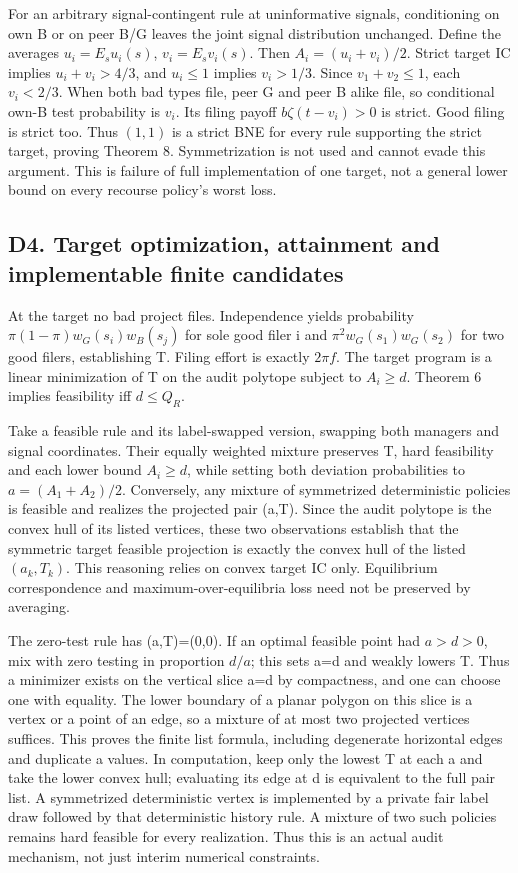 \documentclass[
  11pt,
]{article}
\begin{document}
For an arbitrary signal-contingent rule at uninformative signals,
conditioning on own B or on peer B/G leaves the joint signal
distribution unchanged. Define the averages \(u_i=E_s u_i(s)\),
\(v_i=E_s v_i(s)\). Then \(A_i=(u_i+v_i)/2\). Strict target IC implies
\(u_i+v_i>4/3\), and \(u_i\leq1\) implies \(v_i>1/3\). Since
\(v_1+v_2\leq1\), each \(v_i<2/3\). When both bad types file, peer G and
peer B alike file, so conditional own-B test probability is \(v_i\). Its
filing payoff \(b\zeta(t-v_i)>0\) is strict. Good filing is strict too.
Thus \((1,1)\) is a strict BNE for every rule supporting the strict
target, proving Theorem 8. Symmetrization is not used and cannot evade
this argument. This is failure of full implementation of one target, not
a general lower bound on every recourse policy's worst loss.

\subsection{D4. Target optimization, attainment and implementable finite
candidates}\label{d4.-target-optimization-attainment-and-implementable-finite-candidates}

At the target no bad project files. Independence yields probability
\(\pi(1-\pi)w_G(s_i)w_B(s_j)\) for sole good filer i and
\(\pi^2w_G(s_1)w_G(s_2)\) for two good filers, establishing T. Filing
effort is exactly \(2\pi f\). The target program is a linear
minimization of T on the audit polytope subject to \(A_i\geq d\).
Theorem 6 implies feasibility iff \(d\leq Q_R\).

Take a feasible rule and its label-swapped version, swapping both
managers and signal coordinates. Their equally weighted mixture
preserves T, hard feasibility and each lower bound \(A_i\geq d\), while
setting both deviation probabilities to \(a=(A_1+A_2)/2\). Conversely,
any mixture of symmetrized deterministic policies is feasible and
realizes the projected pair (a,T). Since the audit polytope is the
convex hull of its listed vertices, these two observations establish
that the symmetric target feasible projection is exactly the convex hull
of the listed \((a_k,T_k)\). This reasoning relies on convex target IC
only. Equilibrium correspondence and maximum-over-equilibria loss need
not be preserved by averaging.

The zero-test rule has (a,T)=(0,0). If an optimal feasible point had
\(a>d>0\), mix with zero testing in proportion \(d/a\); this sets a=d
and weakly lowers T. Thus a minimizer exists on the vertical slice a=d
by compactness, and one can choose one with equality. The lower boundary
of a planar polygon on this slice is a vertex or a point of an edge, so
a mixture of at most two projected vertices suffices. This proves the
finite list formula, including degenerate horizontal edges and duplicate
a values. In computation, keep only the lowest T at each a and take the
lower convex hull; evaluating its edge at d is equivalent to the full
pair list. A symmetrized deterministic vertex is implemented by a
private fair label draw followed by that deterministic history rule. A
mixture of two such policies remains hard feasible for every
realization. Thus this is an actual audit mechanism, not just interim
numerical constraints.
\end{document}
